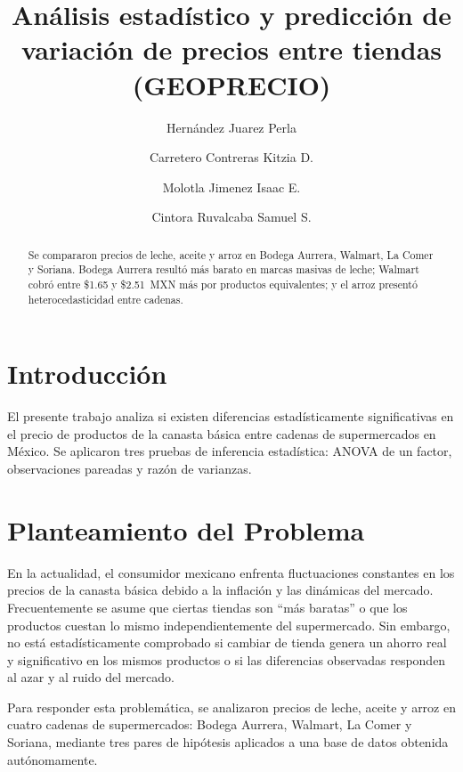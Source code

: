 \documentclass[aps, twocolumn, 11pt]{revtex4-2}
\begin{document}
\title{Análisis estadístico y predicción de variación de precios entre tiendas (GEOPRECIO)}

\author{Hernández Juarez Perla}
\author{Carretero Contreras Kitzia D.}
\author{Molotla Jimenez Isaac E.}
\author{Cintora Ruvalcaba Samuel S.}

\begin{abstract}
Se compararon precios de leche, aceite y arroz en Bodega Aurrera, Walmart, La Comer
y Soriana. Bodega Aurrera resultó más barato en marcas masivas de leche; Walmart cobró entre \$1.65 y \$2.51~MXN más por productos equivalentes; y el arroz presentó heterocedasticidad entre cadenas.
\end{abstract}

\maketitle  

\section{Introducción}

 El presente trabajo analiza si existen diferencias estadísticamente significativas en el precio de productos de la canasta básica entre cadenas de supermercados en México. Se aplicaron tres pruebas de inferencia estadística: ANOVA de un factor, observaciones pareadas y razón de varianzas.

\section{Planteamiento del Problema}

En la actualidad, el consumidor mexicano enfrenta fluctuaciones constantes en los precios de la canasta básica debido a la inflación y las dinámicas del mercado. Frecuentemente se asume que ciertas tiendas son “más baratas” o que los productos cuestan lo mismo independientemente del supermercado. Sin embargo, no está estadísticamente comprobado si cambiar de tienda genera un ahorro real y significativo en los mismos productos o si las diferencias observadas responden al azar y al ruido del mercado.

Para responder esta problemática, se analizaron precios de leche, aceite y arroz en cuatro cadenas de supermercados: Bodega Aurrera, Walmart, La Comer y Soriana, mediante tres pares de hipótesis aplicados a una base de datos obtenida autónomamente.
\end{document}
